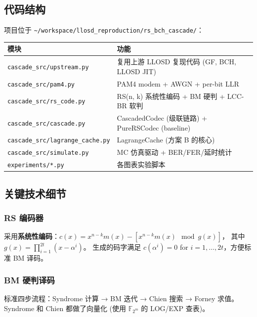 \documentclass[11pt,a4paper]{article}
\begin{document}
\subsection{代码结构}

项目位于 \texttt{\textasciitilde/workspace/llosd\_reproduction/rs\_bch\_cascade/}：

\begin{center}
\begin{tabular}{ll}
\toprule
\textbf{模块} & \textbf{功能} \\
\midrule
\texttt{cascade\_src/upstream.py} & 复用上游 LLOSD 复现代码 (GF, BCH, LLOSD JIT) \\
\texttt{cascade\_src/pam4.py} & PAM4 modem + AWGN + per-bit LLR \\
\texttt{cascade\_src/rs\_code.py} & RS(n, k) 系统性编码 + BM 硬判 + LCC-BR 软判 \\
\texttt{cascade\_src/cascade.py} & CascadedCodec (级联链路) + PureRSCodec (baseline) \\
\texttt{cascade\_src/lagrange\_cache.py} & LagrangeCache (方案 B 的核心) \\
\texttt{cascade\_src/simulate.py} & MC 仿真驱动 + BER/FER/延时统计 \\
\texttt{experiments/*.py} & 各图表实验脚本 \\
\bottomrule
\end{tabular}
\end{center}

\subsection{关键技术细节}

\subsubsection{RS 编码器}

采用\textbf{系统性编码}：$c(x) = x^{n-k} m(x) - [x^{n-k} m(x) \mod g(x)]$，
其中 $g(x) = \prod_{i=1}^{2t}(x - \alpha^i)$。
生成的码字满足 $c(\alpha^i) = 0$ for $i = 1, \ldots, 2t$，方便标准 BM 译码。

\subsubsection{BM 硬判译码}

标准四步流程：Syndrome 计算 → BM 迭代 → Chien 搜索 → Forney 求值。
Syndrome 和 Chien 都做了向量化 (使用 $\mathbb{F}_{2^m}$ 的 LOG/EXP 查表)。
\end{document}
